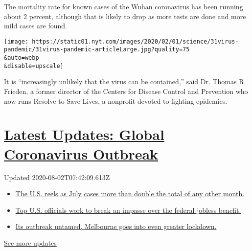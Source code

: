 The mortality rate for known cases of the Wuhan coronavirus has been
running about 2 percent, although that is likely to drop as more tests
are done and more mild cases are found.

\texttt{[image: https://static01.nyt.com/images/2020/02/01/science/31virus-pandemic/31virus-pandemic-articleLarge.jpg?quality=75\\\&auto=webp\\\&disable=upscale]}

It is ``increasingly unlikely that the virus can be contained,'' said
Dr. Thomas R. Frieden, a former director of the Centers for Disease
Control and Prevention who now runs Resolve to Save Lives, a nonprofit
devoted to fighting epidemics.

\hypertarget{latest-updates-global-coronavirus-outbreak}{%
\section{\texorpdfstring{\href{https://www.nytimes.com/2020/08/01/world/coronavirus-covid-19.html?action=click\&pgtype=Article\&state=default\&region=MAIN_CONTENT_1\&context=storylines_live_updates}{Latest
Updates: Global Coronavirus
Outbreak}}{Latest Updates: Global Coronavirus Outbreak}}\label{latest-updates-global-coronavirus-outbreak}}

Updated 2020-08-02T07:42:09.613Z

\begin{itemize}
\tightlist
\item
  \href{https://www.nytimes.com/2020/08/01/world/coronavirus-covid-19.html?action=click\&pgtype=Article\&state=default\&region=MAIN_CONTENT_1\&context=storylines_live_updates\#link-34047410}{The
  U.S. reels as July cases more than double the total of any other
  month.}
\item
  \href{https://www.nytimes.com/2020/08/01/world/coronavirus-covid-19.html?action=click\&pgtype=Article\&state=default\&region=MAIN_CONTENT_1\&context=storylines_live_updates\#link-780ec966}{Top
  U.S. officials work to break an impasse over the federal jobless
  benefit.}
\item
  \href{https://www.nytimes.com/2020/08/01/world/coronavirus-covid-19.html?action=click\&pgtype=Article\&state=default\&region=MAIN_CONTENT_1\&context=storylines_live_updates\#link-2bc8948}{Its
  outbreak untamed, Melbourne goes into even greater lockdown.}
\end{itemize}

\href{https://www.nytimes.com/2020/08/01/world/coronavirus-covid-19.html?action=click\&pgtype=Article\&state=default\&region=MAIN_CONTENT_1\&context=storylines_live_updates}{See
more updates}

